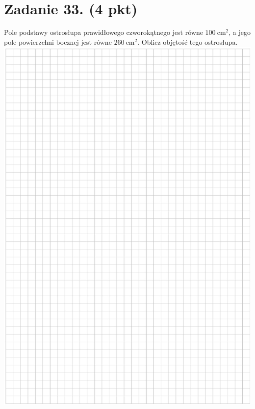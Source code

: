 \documentclass[10pt]{article}
\begin{document}
\section*{Zadanie 33. (4 pkt)}
Pole podstawy ostrosłupa prawidłowego czworokątnego jest równe \(100 \mathrm{~cm}^{2}\), a jego pole powierzchni bocznej jest równe \(260 \mathrm{~cm}^{2}\). Oblicz objętość tego ostrosłupa.\\
\includegraphics[max width=\textwidth, center]{2024_11_21_e0e8aab895018a50a9a7g-18}\\
\end{document}
